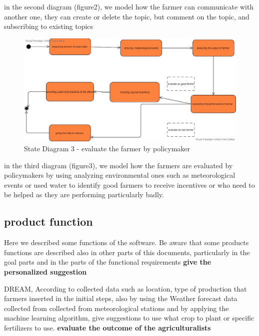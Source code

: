 in the second diagram (figure2), we model how the farmer can communicate with another one,
they can create or delete the  topic, but comment on the topic, and subscribing to existing topics


 \begin{figure}[H]
\includegraphics[width=1\textwidth]{figures/thirdStateDiagram.jpg}
\caption{\label{fig:student } State Diagram 3 - evaluate the farmer by policymaker }
\end{figure}
in the third diagram (figure3), we model how the farmers are evaluated by policymakers by using analyzing environmental ones such as meteorological events or used water to identify good farmers to receive incentives or who need to be helped as they are performing particularly badly. 


\subsection{product function}
Here we described some functions of the software. Be aware that some products functions are described also in other parts of this documents, particularly in the goal parts and in the parts of the functional requirements
 \newline
 \newline
\textbf{give the personalized suggestion}

DREAM, According to collected data such as location, type of production that farmers inserted in the initial steps, also by using the Weather forecast data collected from collected from meteorological stations and by applying the machine learning algorithm, give suggestions to use what crop to plant or specific fertilizers to use.
 \newline
 \newline
\textbf{evaluate the outcome of the agriculturalists}

